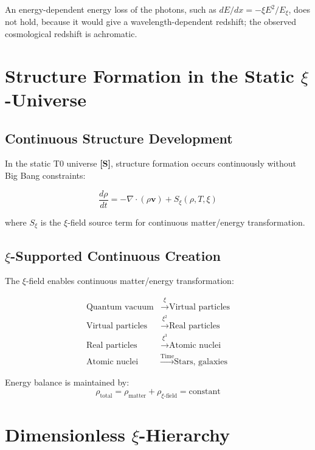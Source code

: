 	An energy-dependent energy loss of the photons, such as $dE/dx = -\xi E^2/E_\xi$, does not hold, because it would give a wavelength-dependent redshift; the observed cosmological redshift is achromatic.
	
	\section{Structure Formation in the Static $\xi$-Universe}
	
	\subsection{Continuous Structure Development}
	
	In the static T0 universe \textbf{[S]}, structure formation occurs continuously without Big Bang constraints:
	
	\begin{equation}
		\frac{d\rho}{dt} = -\nabla \cdot (\rho \mathbf{v}) + S_\xi(\rho, T, \xi)
	\end{equation}
	
	where $S_\xi$ is the $\xi$-field source term for continuous matter/energy transformation.
	
	\subsection{$\xi$-Supported Continuous Creation}
	
	The $\xi$-field enables continuous matter/energy transformation:
	
	\begin{align}
		\text{Quantum vacuum} &\xrightarrow{\xi} \text{Virtual particles} \\
		\text{Virtual particles} &\xrightarrow{\xi^2} \text{Real particles} \\
		\text{Real particles} &\xrightarrow{\xi^3} \text{Atomic nuclei} \\
		\text{Atomic nuclei} &\xrightarrow{\text{Time}} \text{Stars, galaxies}
	\end{align}
	
	Energy balance is maintained by:
	\begin{equation}
		\rho_{\text{total}} = \rho_{\text{matter}} + \rho_{\xi\text{-field}} = \text{constant}
	\end{equation}
	
	\section{Dimensionless $\xi$-Hierarchy}
	
